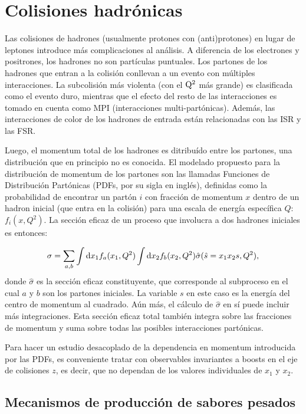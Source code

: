 \section{Colisiones hadrónicas}

Las colisiones de hadrones (usualmente protones con (anti)protones) en lugar de leptones introduce más complicaciones al análisis. A diferencia de los electrones y positrones, los hadrones no son partículas puntuales. Los partones de los hadrones que entran a la colisión conllevan a un evento con múltiples interacciones. La subcolisión más violenta (con el ${\mathrm Q}^2$ más grande) es clasificada como el evento duro, mientras que el efecto del resto de las interacciones es tomado en cuenta como MPI (interacciones multi-partónicas). Además, las interacciones de color de los hadrones de entrada están relacionadas con las ISR y las FSR. 


Luego, el momentum total de los hadrones es ditribuído entre los partones, una distribución que en principio no es conocida. El modelado propuesto para la distribución de momentum de los partones son las llamadas Funciones de Distribución Partónicas (PDFs, por su sigla en inglés), definidas como la probabilidad de encontrar un partón $i$ con fracción de momentum $x$ dentro de un hadron inicial (que entra en la colisión) para una escala de energía específica $Q$: $f_i(x,Q^2)$. La sección eficaz de un proceso que involucra a dos hadrones iniciales es entonces:

\begin{equation}
\sigma = \sum_{a,b} \int {\mathrm d} x_1 f_a(x_1,Q^2) \int {\mathrm d} x_2 f_b(x_2,Q^2) \hat{\sigma} (\hat{s}=x_1x_2s,Q^2), 
\end{equation}
donde $\hat{\sigma}$ es la sección eficaz constituyente, que corresponde al subproceso en el cual $a$ y $b$ son los partones iniciales. La variable $s$ en este caso es la energía del centro de momentum al cuadrado. Aún más, el cálculo de $\hat{\sigma}$ en sí puede incluir más integraciones. Esta sección eficaz total también integra sobre las fracciones de momentum y suma sobre todas las posibles interacciones partónicas.

Para hacer un estudio desacoplado de la dependencia en momentum introducida por las PDFs, es conveniente tratar con observables invariantes a boosts en el eje de colisiones $z$, es decir, que no dependan de los valores individuales de $x_1$ y $x_2$.

\subsection{Mecanismos de producción de sabores pesados}

